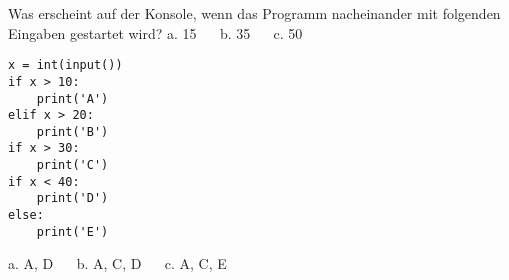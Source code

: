 \question[3] Was erscheint auf der Konsole, wenn das Programm nacheinander mit folgenden Eingaben gestartet wird?
a. 15   ~~  b. 35 ~~ c. 50
\begin{lstlisting}
x = int(input())
if x > 10:
    print('A')
elif x > 20:
    print('B')
if x > 30:
    print('C')
if x < 40:
    print('D')
else:
    print('E')
\end{lstlisting}

\begin{solutionbox}{1cm}
a. A, D ~~ b. A, C, D ~~ c. A, C, E
\end{solutionbox}
